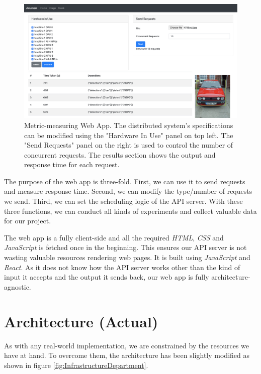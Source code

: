 \documentclass{report}
\begin{document}
\begin{figure}[h!]
  \includegraphics[width=\textwidth]{acumenwebapp.png}
  \caption{Metric-measuring Web App. The distributed system's specifications can be modified using the "Hardware In Use" panel on top left. The "Send Requests" panel on the right is used to control the number of concurrent requests. The results section shows the output and response time for each request.}
  \label{fig:WebApp}
\end{figure}

The purpose of the web app is three-fold.
First, we can use it to send requests and measure response time.
Second, we can modify the type/number of requests we send.
Third, we can set the scheduling logic of the API server.
With these three functions, we can conduct all kinds of experiments and collect valuable data for our project.

The web app is a fully client-side and all the required \textit{HTML}, \textit{CSS} and \textit{JavaScript} is fetched once in the beginning.
This ensures our API server is not wasting valuable resources rendering web pages.
It is built using \textit{JavaScript} and \textit{React}.
As it does not know how the API server works other than the kind of input it accepts and the output it sends back, our web app is fully architecture-agnostic.

\section{Architecture (Actual)}

As with any real-world implementation, we are constrained by the resources we have at hand. To overcome them, the architecture has been slightly modified as shown in figure \ref{fig:InfrastructureDepartment}.
\end{document}
